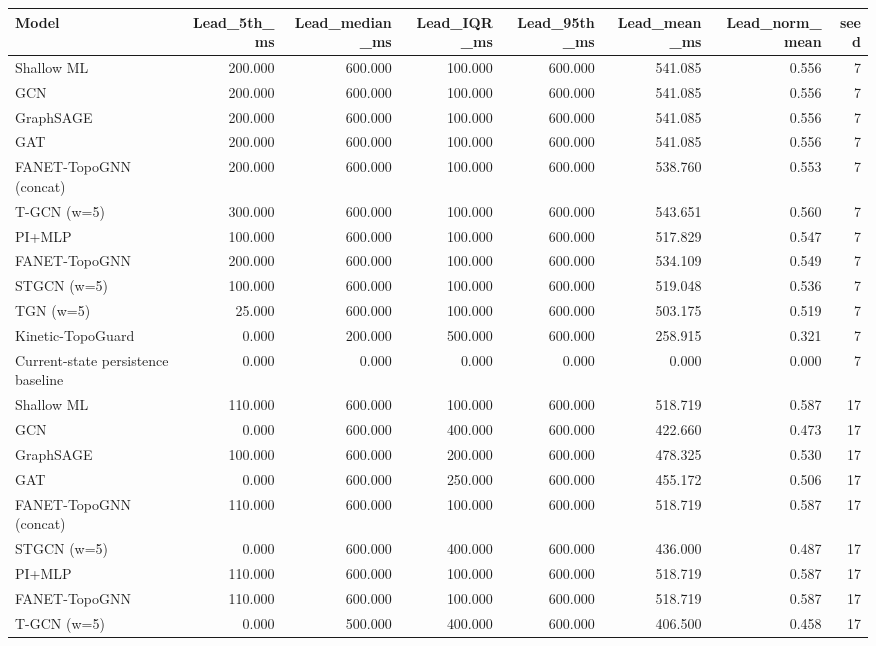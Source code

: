 \begin{tabular}{lrrrrrrr}
\toprule
Model & Lead\_5th\_ms & Lead\_median\_ms & Lead\_IQR\_ms & Lead\_95th\_ms & Lead\_mean\_ms & Lead\_norm\_mean & seed \\
\midrule
Shallow ML & 200.000 & 600.000 & 100.000 & 600.000 & 541.085 & 0.556 & 7 \\
GCN & 200.000 & 600.000 & 100.000 & 600.000 & 541.085 & 0.556 & 7 \\
GraphSAGE & 200.000 & 600.000 & 100.000 & 600.000 & 541.085 & 0.556 & 7 \\
GAT & 200.000 & 600.000 & 100.000 & 600.000 & 541.085 & 0.556 & 7 \\
FANET-TopoGNN (concat) & 200.000 & 600.000 & 100.000 & 600.000 & 538.760 & 0.553 & 7 \\
T-GCN (w=5) & 300.000 & 600.000 & 100.000 & 600.000 & 543.651 & 0.560 & 7 \\
PI+MLP & 100.000 & 600.000 & 100.000 & 600.000 & 517.829 & 0.547 & 7 \\
FANET-TopoGNN & 200.000 & 600.000 & 100.000 & 600.000 & 534.109 & 0.549 & 7 \\
STGCN (w=5) & 100.000 & 600.000 & 100.000 & 600.000 & 519.048 & 0.536 & 7 \\
TGN (w=5) & 25.000 & 600.000 & 100.000 & 600.000 & 503.175 & 0.519 & 7 \\
Kinetic-TopoGuard & 0.000 & 200.000 & 500.000 & 600.000 & 258.915 & 0.321 & 7 \\
Current-state persistence baseline & 0.000 & 0.000 & 0.000 & 0.000 & 0.000 & 0.000 & 7 \\
Shallow ML & 110.000 & 600.000 & 100.000 & 600.000 & 518.719 & 0.587 & 17 \\
GCN & 0.000 & 600.000 & 400.000 & 600.000 & 422.660 & 0.473 & 17 \\
GraphSAGE & 100.000 & 600.000 & 200.000 & 600.000 & 478.325 & 0.530 & 17 \\
GAT & 0.000 & 600.000 & 250.000 & 600.000 & 455.172 & 0.506 & 17 \\
FANET-TopoGNN (concat) & 110.000 & 600.000 & 100.000 & 600.000 & 518.719 & 0.587 & 17 \\
STGCN (w=5) & 0.000 & 600.000 & 400.000 & 600.000 & 436.000 & 0.487 & 17 \\
PI+MLP & 110.000 & 600.000 & 100.000 & 600.000 & 518.719 & 0.587 & 17 \\
FANET-TopoGNN & 110.000 & 600.000 & 100.000 & 600.000 & 518.719 & 0.587 & 17 \\
T-GCN (w=5) & 0.000 & 500.000 & 400.000 & 600.000 & 406.500 & 0.458 & 17 \\

\end{tabular}
